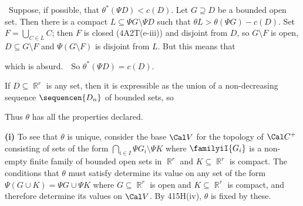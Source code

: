 {

\noindent\Quer\ Suppose, if possible, that $\theta^*(\Psi D)<c(D)$.
Let $G\supseteq D$ be a bounded open set.   Then there is a compact
$L\subseteq\Psi G\setminus\Psi D$ such that
$\theta L>\theta(\Psi G)-c(D)$.   Set $F=\bigcup_{C\in L}C$;  then $F$
is closed (4A2T(e-iii)) and disjoint from $D$, so $G\setminus F$ is open,
$D\subseteq G\setminus F$ and $\Psi(G\setminus F)$ is disjoint from $L$.
But this means that


\noindent which is absurd.\ \BanG\  So $\theta^*(\Psi D)=c(D)$.

If $D\subseteq\BbbR^r$ is any set, then it is expressible as the union of a
non-decreasing sequence $\sequencen{D_n}$ of bounded sets, so


\noindent Thus $\theta$ has all the properties declared.

\medskip

{\bf (i)} To see that $\theta$ is unique, consider the base $\Cal V$ for
the topology of $\Cal C^+$ consisting of sets of the form
$\bigcap_{i\in I}\Psi G_i\setminus\Psi K$ where $\familyiI{G_i}$ is a
non-empty finite family of bounded open sets in $\BbbR^r$ and
$K\subseteq\BbbR^r$ is compact.   The conditions that $\theta$ must satisfy
determine its value on any set of the form
$\Psi(G\cup K)=\Psi G\cup\Psi K$ where $G\subseteq\BbbR^r$ is open and
$K\subseteq\BbbR^r$ is compact, and therefore determine its values on
$\Cal V$.   By 415H(iv), $\theta$ is fixed by these.
}%

